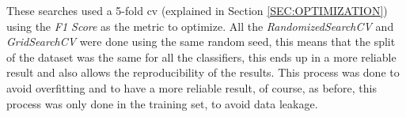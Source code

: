 These searches 
used
a 5-fold \ac{cv} (explained in Section \ref{SEC:OPTIMIZATION}) using the \textit{F1 Score} as the metric to optimize. All the \textit{RandomizedSearchCV} and \textit{GridSearchCV} were done using the same random seed, this means that the split of the dataset was the same for all the classifiers, this ends up in a more reliable result and also allows the reproducibility of the results. This process was done to avoid overfitting and to have a more reliable result, of course, as before, this process was only done in the training set, to avoid data leakage.